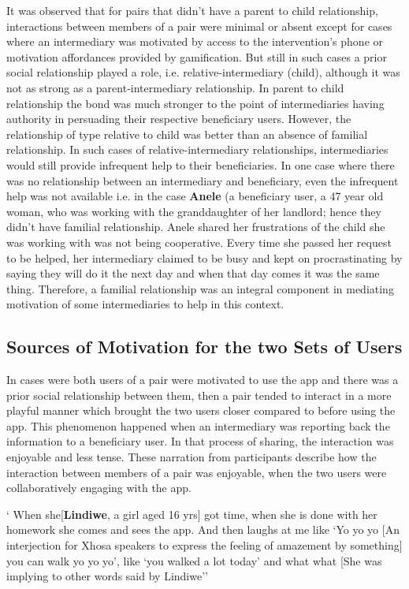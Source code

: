 It was observed that for pairs that didn't have a parent to child relationship, interactions between members of a pair were minimal or absent except for cases where an intermediary was motivated by access to the intervention's phone or motivation affordances provided by gamification. But still in such cases a prior social relationship played a role, i.e. relative-intermediary (child), although it was not as strong as a parent-intermediary relationship. In parent to child relationship the bond was much stronger to the point of intermediaries having authority in persuading their respective beneficiary users. However, the relationship of type relative to child was better than an absence of  familial relationship. In such cases of relative-intermediary relationships, intermediaries would still provide infrequent help to their beneficiaries.  In one case where there was no relationship between an intermediary and beneficiary, even the infrequent help was not available i.e. in the case \textbf{Anele} (a beneficiary user, a 47 year old woman, who was working with the granddaughter of her landlord; hence they didn't have familial relationship. Anele shared her frustrations of the child she was working with was not being cooperative.  Every time she passed her request to be helped, her intermediary claimed to be busy and kept on procrastinating by saying they will do it the next day and when that day comes it was the same thing. Therefore, a familial relationship was an integral component in mediating motivation of some intermediaries to help in this context.   
\subsection{Sources of Motivation for the two Sets of Users}
In cases were both users of a pair were motivated to use the app and there was a prior social relationship between them, then a pair tended to interact in a more playful manner which brought the two users closer compared to before using the app. This phenomenon happened when an intermediary was reporting back the information to a beneficiary user. In that process of sharing, the interaction was enjoyable and less tense. These narration from participants describe how the interaction  between members of a pair was enjoyable, when the two users were collaboratively engaging with the app.

 {` When she[\textbf{Lindiwe}, a girl aged 16 yrs] got time, when she is done with her homework she comes and sees the app. And then laughs at me like `Yo yo yo [An interjection for Xhosa speakers to express the feeling of amazement by something] you can walk yo yo yo', like `you walked a lot today' and what what [She was implying to other words said by Lindiwe''}

